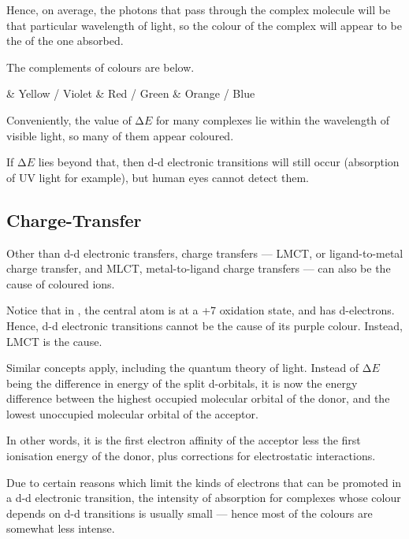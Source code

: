				Hence, on average, the photons that pass through the complex molecule will be  that particular wavelength of
				light, so the colour of the complex will appear to be the  of the one absorbed.

				The complements of colours are below.

				\begin{bulletlist}
					& Yellow / Violet
					& Red / Green
					& Orange / Blue
				\end{bulletlist}

				Conveniently, the value of $∆E$ for many complexes lie within the wavelength of visible light, so many of them appear
				coloured.

				If $∆E$ lies beyond that, then d-d electronic transitions will still occur (absorption of UV light for example),
				but human eyes cannot detect them.




		\pagebreak
		\subsection{Charge-Transfer}

			Other than d-d electronic transfers, charge transfers --- LMCT, or ligand-to-metal charge transfer, and MLCT, metal-to-ligand
			charge transfers --- can also be the cause of coloured ions.

			Notice that in , the central  atom is at a +7 oxidation state, and has  d-electrons. Hence, d-d electronic
			transitions cannot be the cause of its  purple colour. Instead, LMCT is the cause.

			Similar concepts apply, including the quantum theory of light. Instead of $∆E$ being the difference in energy of the split
			d-orbitals, it is now the energy difference between the highest occupied molecular orbital of the donor, and the lowest unoccupied
			molecular orbital of the acceptor.

			In other words, it is the first electron affinity of the acceptor less the first ionisation energy of the donor, plus corrections
			for electrostatic interactions.


			Due to certain reasons which limit the kinds of electrons that can be promoted in a d-d electronic transition, the intensity of
			absorption for complexes whose colour depends on d-d transitions is usually small --- hence most of the colours are somewhat
			less intense.

